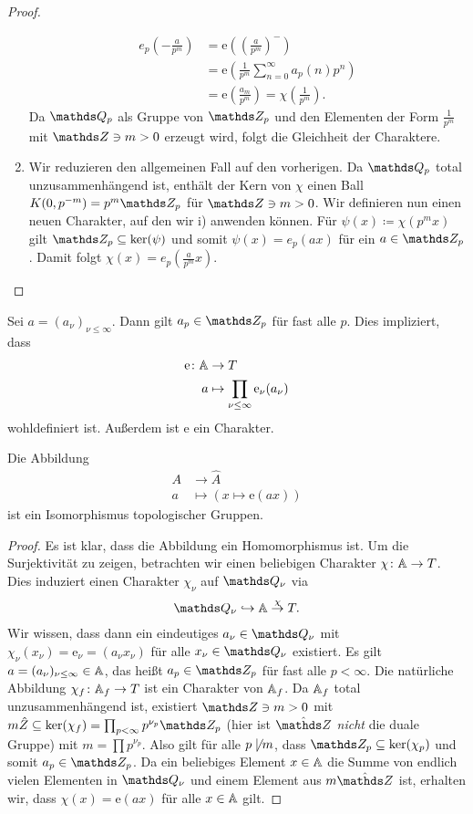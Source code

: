 \begin{proof}
\begin{enumerate}[label=\roman*)]
\begin{align*}
e_p\left(-\frac{a}{p^m}\right)&=\mathrm{e}\left(\left(\frac{a}{p^m}\right)^-\right)\\
&=\mathrm{e}\left(\frac{1}{p^m}\sum_{n=0}^\infty a_p(n)p^n\right)\\
&=\mathrm{e}\left(\frac{a_m}{p^m}\right)=\chi\left(\frac{1}{p^m}\right).
\end{align*}
Da $\Q_p$ als Gruppe von $\Z_p$ und den Elementen der Form $\frac{1}{p^m}$ mit $\Z \ni m>0$ erzeugt wird, folgt die Gleichheit der Charaktere.
\item Wir reduzieren den allgemeinen Fall auf den vorherigen.
Da $\Q_p$ total unzusammenhängend ist, enthält der Kern von $\chi$ einen Ball $K(0,p^{-m})=p^m \Z_p$ für $\Z \ni m>0$.
Wir definieren nun einen neuen Charakter, auf den wir i) anwenden können.
Für $\psi(x)\coloneqq \chi(p^mx)$ gilt $\Z_p \subseteq \ker(\psi)$ und somit $\psi(x)=e_p(ax)$ für ein $a\in \Z_p$.
Damit folgt $\chi(x)=e_p(\frac{a}{p^m}x)$. \qedhere
\end{enumerate}
\end{proof}

Sei $a=(a_\nu)_{\nu \leq \infty}$. Dann gilt $a_p \in \Z_p$ für fast alle $p$.
Dies impliziert, dass
\begin{align*}
\mathrm{e}\colon \mathbb{A} &\to T\\
a &\mapsto \prod_{\nu \leq \infty} \mathrm{e}_\nu(a_\nu) 
\end{align*}
wohldefiniert ist. Außerdem ist $\mathrm{e}$ ein Charakter.

\begin{prop}
Die Abbildung
\begin{align*}
A &\to \hat{A}\\
a&\mapsto (x \mapsto \mathrm{e}(ax))
\end{align*}
ist ein Isomorphismus topologischer Gruppen.
\end{prop}
\begin{proof}
Es ist klar, dass die Abbildung ein Homomorphismus ist.
Um die Surjektivität zu zeigen, betrachten wir einen beliebigen Charakter $\chi \colon \mathbb{A} \to T$.
Dies induziert einen Charakter $\chi_\nu$ auf $\Q_\nu$ via
\begin{align*}
\Q_\nu \hookrightarrow \A \overset{\chi}{\to} T.
\end{align*}
Wir wissen, dass dann ein eindeutiges $a_\nu \in \Q_\nu$ mit $\chi_\nu(x_\nu)=\mathrm{e}_\nu=(a_\nu x_\nu)$ für alle $x_\nu \in \Q_\nu$ existiert.
Es gilt $a=(a_\nu)_{\nu \leq \infty}\in \mathbb{A}$, das heißt $a_p \in \Z_p$ für fast alle $p<\infty$.
Die natürliche Abbildung $\chi_f \colon \mathbb{A}_f \to T$ ist ein Charakter von $\mathbb{A}_f$.
Da $\mathbb{A}_f$ total unzusammenhängend ist, existiert $\Z \ni m >0$ mit
$m \hat{Z} \subseteq \ker(\chi_f)=\prod_{p<\infty} p^{\nu_p} \Z_p$ (hier ist $\hat{\Z}$ \emph{nicht} die duale Gruppe) mit $m=\prod p^{\nu_p}$.
Also gilt für alle $p \not \mid m$, dass $\Z_p \subseteq \ker(\chi_p)$ und somit $a_p \in \Z_p$.
Da ein beliebiges Element $x\in \mathbb{A}$ die Summe von endlich vielen Elementen in $\Q_\nu$ und einem Element aus $m\hat{\Z}$ ist, erhalten wir, dass $\chi(x)=\mathrm{e}(ax)$ für alle $x\in \mathbb{A}$ gilt.
\end{proof}

